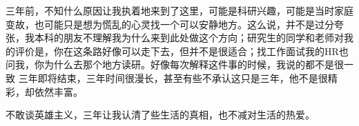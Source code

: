 






三年前，不知什么原因让我执着地来到了这里，可能是科研兴趣，可能是当时家庭变故，也可能只是想为慌乱的心灵找一个可以安静地方。这么说，并不是过分夸张，我本科的朋友不理解我为什么来到此处做这个方向；研究生的同学和老师对我的评价是，你在这条路好像可以走下去，但并不是很适合；找工作面试我的HR也问我，你为什么去那个地方读研。好像每次解释这件事的时候，我说的都不是很一致
三年即将结束，三年时间很漫长，甚至有些不承认这只是三年，他不是很精彩，却依然丰富。


不敢谈英雄主义，三年让我认清了些生活的真相，也不减对生活的热爱。